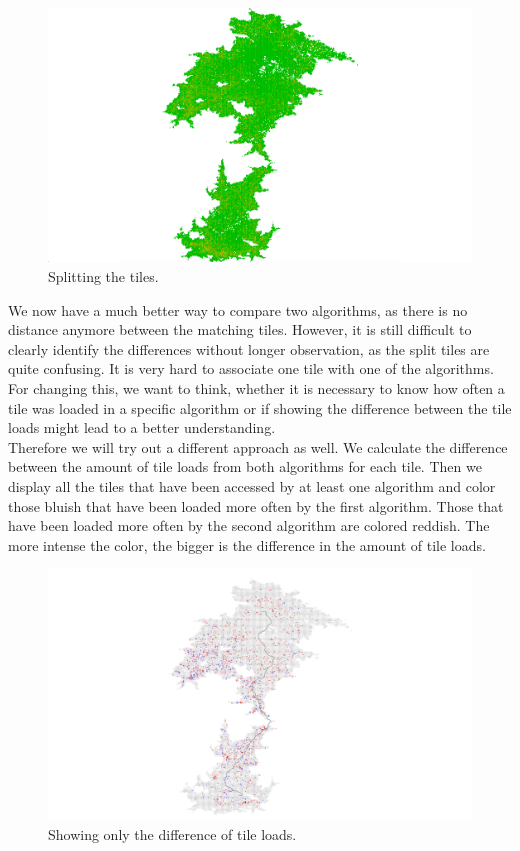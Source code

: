 \documentclass
[
	paper = a4,
    pagesize,
	12 pt,
	oneside,                       %
    open = right,
	DIV = calc,
	BCOR = 0 mm,                   %
	bibtotoc
]
{scrbook}
\begin{document}
\begin{figure}[H]
    \includegraphics[width=\textwidth]{Images/vis-compare-splitted.png}
\caption[]{Splitting the tiles.}
\label{fig:splitted tiles}
\end{figure}


We now have a much better way to compare two algorithms, as there is no distance anymore between the matching tiles.
However, it is still difficult to clearly identify the differences without longer observation, as the split tiles are quite confusing.
It is very hard to associate one tile with one of the algorithms.
For changing this, we want to think, whether it is necessary to know how often a tile was loaded in a specific algorithm or if showing the difference between the tile loads might lead to a better understanding.\\
Therefore we will try out a different approach as well.
We calculate the difference between the amount of tile loads from both algorithms for each tile.
Then we display all the tiles that have been accessed by at least one algorithm and color those bluish that have been loaded more often by the first algorithm.
Those that have been loaded more often by the second algorithm are colored reddish.
The more intense the color, the bigger is the difference in the amount of tile loads.

\begin{figure}[H]
    \includegraphics[width=\textwidth]{Images/vis-compare-colored.png}
\caption[]{Showing only the difference of tile loads.}
\label{fig:difference}
\end{figure}
\end{document}
